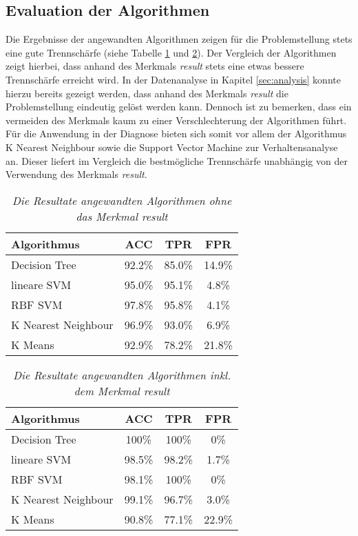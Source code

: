\subsection{Evaluation der Algorithmen} \label{sec:evaluation}
Die Ergebnisse der angewandten Algorithmen zeigen für die Problemstellung stets eine gute Trennschärfe (siehe Tabelle \ref{tbl:results_table_without} und \ref{tbl:results_table}). Der Vergleich der Algorithmen zeigt hierbei, dass anhand des Merkmals \textit{result} stets eine etwas bessere Trennschärfe erreicht wird. In der Datenanalyse in Kapitel \ref{sec:analysis} konnte hierzu bereits gezeigt werden, dass anhand des Merkmals \textit{result} die Problemstellung eindeutig gelöst werden kann. Dennoch ist zu bemerken, dass ein vermeiden des Merkmals kaum zu einer Verschlechterung der Algorithmen führt. Für die Anwendung in der Diagnose bieten sich somit vor allem der Algorithmus K Nearest Neighbour sowie die Support Vector Machine zur Verhaltensanalyse an. Dieser liefert im Vergleich die bestmögliche Trennschärfe unabhängig von der Verwendung des Merkmals \textit{result}.

\begin{table}[htbp]
\begin{tabular}{l c c c}
\textbf{Algorithmus} & \textbf{ACC} & \textbf{TPR} & \textbf{FPR} \\ \hline
Decision Tree & 92.2\% & 85.0\% & 14.9\% \\
lineare SVM & 95.0\% & 95.1\% & 4.8\% \\
RBF SVM & 97.8\% & 95.8\% & 4.1\% \\
K Nearest Neighbour & 96.9\% & 93.0\% & 6.9\%\\ 
K Means & 92.9\% & 78.2\% & 21.8\%\\ 
\end{tabular}
\centering
\caption{\em Die Resultate angewandten Algorithmen ohne das Merkmal \glqq result\grqq}
\label{tbl:results_table_without}
\end{table}

\begin{table}[htbp]
\begin{tabular}{l c c c}
\textbf{Algorithmus} & \textbf{ACC} & \textbf{TPR} & \textbf{FPR} \\ \hline
Decision Tree & 100\% & 100\% & 0\% \\
lineare SVM & 98.5\% & 98.2\% & 1.7\% \\
RBF SVM & 98.1\% & 100\% & 0\% \\
K Nearest Neighbour & 99.1\% & 96.7\% & 3.0\%\\ 
K Means & 90.8\% & 77.1\% & 22.9\%\\ 
\end{tabular}
\centering
\caption{\em Die Resultate angewandten Algorithmen inkl. dem Merkmal \glqq result\grqq}
\label{tbl:results_table}
\end{table}
